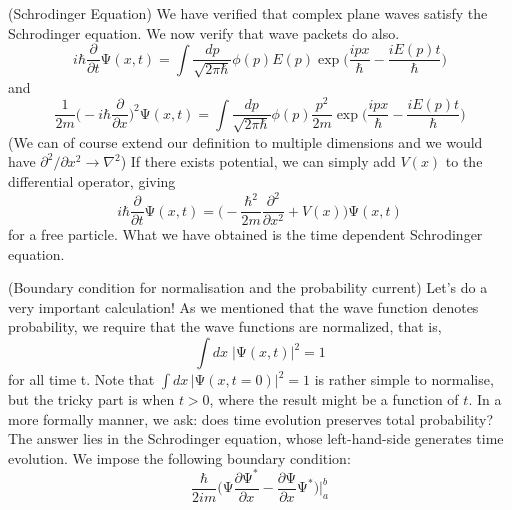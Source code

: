 \begin{defi}
(Schrodinger Equation) We have verified that complex plane waves satisfy the Schrodinger equation. We now verify that wave packets do also.
\[i\hbar \dfrac{\partial }{\partial t}\mathrm{\Psi} (x,t)=\int \dfrac{dp}{\sqrt{2\pi \hbar }}\phi (p)E(p)\exp\Big(\dfrac{ipx}{\hbar }-\dfrac{iE(p)t}{\hbar }\Big)\]
and
\[\dfrac{1}{2m}\Big(-i\hbar \dfrac{\partial }{\partial x}\Big)^2\mathrm{\Psi} (x,t)=\int \dfrac{dp}{\sqrt{2\pi \hbar }}\phi (p)\dfrac{p^2}{2m}\exp\Big(\dfrac{ipx}{\hbar }-\dfrac{iE(p)t}{\hbar }\Big) \]
(We can of course extend our definition to multiple dimensions and we would have $\partial ^2/\partial x^2\rightarrow \nabla ^2$) If there exists potential, we can simply add $V(x)$ to the differential operator, giving
\[i\hbar \dfrac{\partial }{\partial t}\mathrm{\Psi} (x,t)=\Big(-\dfrac{\hbar ^2}{2m}\dfrac{\partial ^2}{\partial x^2}+V(x)\Big)\mathrm{\Psi} (x,t)  \]
for a free particle. What we have obtained is the time dependent Schrodinger equation.

\end{defi}
\vspace{2ex}
\begin{rmk}
(Boundary condition for normalisation and the probability current) Let's do a very important calculation! As we mentioned that the wave function denotes probability, we require that the wave functions are normalized, that is,
\[\int dx\;|\mathrm{\Psi} (x,t)|^2=1\]
for all time t. Note that $\int dx\,|\mathrm{\Psi} (x,t=0)|^2=1$ is rather simple to normalise, but the tricky part is when $t>0$, where the result might be a function of $t$. In a more formally manner, we ask: does time evolution preserves total probability? The answer lies in the Schrodinger equation, whose left-hand-side generates time evolution. We impose the following boundary condition:
\[\dfrac{\hbar }{2im}\Big(\mathrm{\Psi} \dfrac{\partial \mathrm{\Psi} ^{*}}{\partial x}-\dfrac{\partial \mathrm{\Psi} }{\partial x}\mathrm{\Psi} ^{*} \Big)\Big|^{b}_{a}\]
\end{rmk}
\vspace{2ex}
